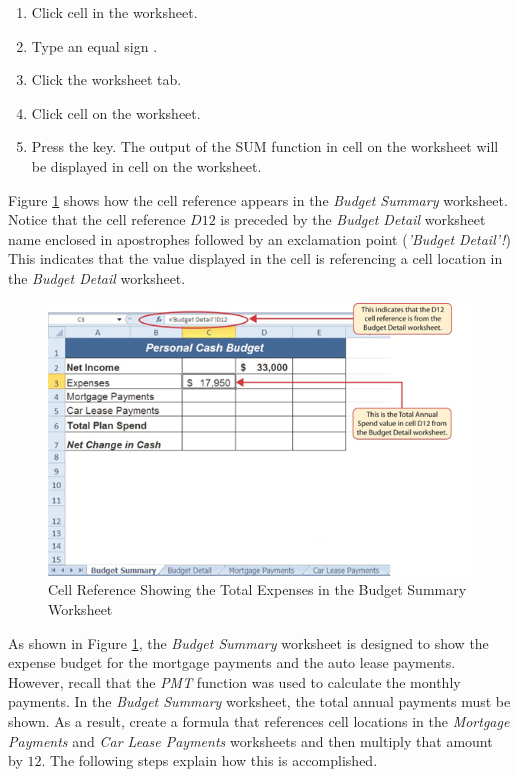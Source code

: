 \begin{enumerate}
	\item Click cell  in the  worksheet.
	\item Type an equal sign \fmtTyping{=}.
	\item Click the  worksheet tab.
	\item Click cell  on the  worksheet.
	\item Press the  key. The output of the SUM function in cell  on the  worksheet will be displayed in cell  on the  worksheet.
\end{enumerate}

Figure \ref{02:fig36} shows how the cell reference appears in the \textit{Budget Summary} worksheet. Notice that the cell reference $ D12 $ is preceded by the \textit{Budget Detail} worksheet name enclosed in apostrophes followed by an exclamation point (\textit{'Budget Detail'!}) This indicates that the value displayed in the cell is referencing a cell location in the \textit{Budget Detail} worksheet.

\begin{figure}[H]
	\centering
	\includegraphics[width=\maxwidth{.95\linewidth}]{gfx/ch02_fig36}
	\caption{Cell Reference Showing the Total Expenses in the Budget Summary Worksheet}
	\label{02:fig36}
\end{figure}

As shown in Figure \ref{02:fig36}, the \textit{Budget Summary} worksheet is designed to show the expense budget for the mortgage payments and the auto lease payments. However, recall that the \textit{PMT} function was used to calculate the monthly payments. In the \textit{Budget Summary} worksheet, the total annual payments must be shown. As a result, create a formula that references cell locations in the \textit{Mortgage Payments} and \textit{Car Lease Payments} worksheets and then multiply that amount by $ 12 $. The following steps explain how this is accomplished.

